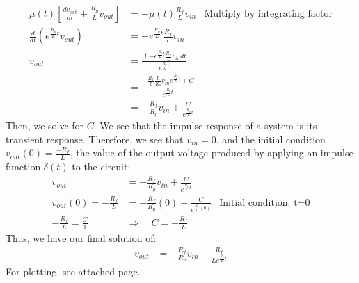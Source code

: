 \documentclass[12pt, a4paper]{article}
\begin{document}
\begin{enumerate}[(a)]
\begin{align*}
\mu(t) \left [ \frac{d v_{out}}{d t}+\frac{R_{p}}{L} v_{out} \right ] &= -\mu(t) \frac{R_{f}}{L} v_{i n} &\text{Multiply by integrating factor} \\
 \frac{d}{dt}(e^{\frac{R_p}{L}t} v_{out}) &=  -e^{\frac{R_p}{L}t} \frac{R_{f}}{L} v_{i n} \\
v_{out} &= \frac{\int -e^{\frac{R_p}{L}t} \frac{R_{f}}{L} v_{i n} dt}{e^{\frac{R_p}{L}t} } \\
&= \frac{-\frac{R_f}{L}\frac{L}{R_p} v_{in} e^{\frac{R_p}{L}t} + C}{e^{\frac{R_p}{L}t}}\\
&= -\frac{R_f}{R_p}v_{in} + \frac{C}{e^{\frac{R_p}{L}t}}
\end{align*}
Then, we solve for $C$. We see that the impulse response of a system is its transient response. Therefore, we see that $v_{in} = 0$, and the initial condition $v_{out}(0) = \frac{-R_f}{L}$, the value of the output voltage produced by applying an impulse function $\delta(t)$ to the circuit:
\begin{align*}
v_{out} &= -\frac{R_f}{R_p}v_{in} + \frac{C}{e^{\frac{R_p}{L}t}} \\ 
v_{out}(0) = -\frac{R_f}{L} &= -\frac{R_f}{R_p}(0) + \frac{C}{e^{\frac{R_p}{L} (0)}} &\text{Initial condition: t=0} \\
-\frac{R_f}{L} = \frac{C}{1} \quad &\Rightarrow \quad C = -\frac{R_f}{L}
\end{align*}
Thus, we have our final solution of:
\begin{align*}
v_{out} &= -\frac{R_f}{R_p}v_{in} - \frac{R_f}{Le^{\frac{R_p}{L}t}}
\end{align*}
For plotting, see attached page.
\end{enumerate}
\end{document}
